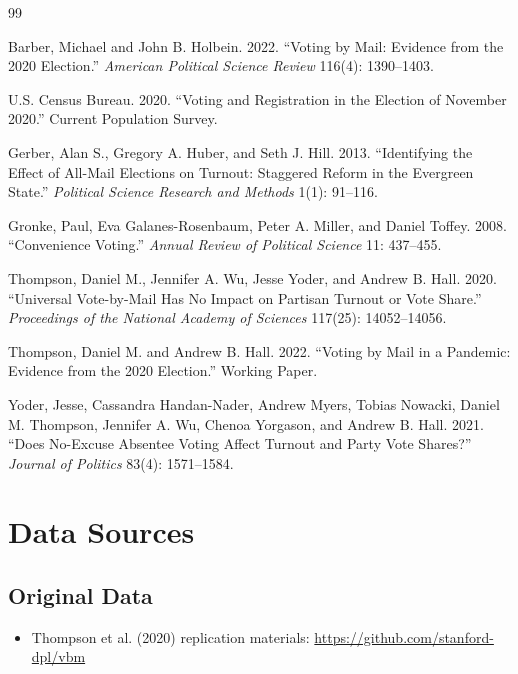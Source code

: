 \documentclass[12pt]{article}
\begin{document}
\newpage

\begin{thebibliography}{99}

Barber, Michael and John B. Holbein. 2022.
\newblock ``Voting by Mail: Evidence from the 2020 Election.''
\newblock \textit{American Political Science Review} 116(4): 1390--1403.

U.S. Census Bureau. 2020.
\newblock ``Voting and Registration in the Election of November 2020.''
\newblock Current Population Survey.

Gerber, Alan S., Gregory A. Huber, and Seth J. Hill. 2013.
\newblock ``Identifying the Effect of All-Mail Elections on Turnout: Staggered Reform in the Evergreen State.''
\newblock \textit{Political Science Research and Methods} 1(1): 91--116.

Gronke, Paul, Eva Galanes-Rosenbaum, Peter A. Miller, and Daniel Toffey. 2008.
\newblock ``Convenience Voting.''
\newblock \textit{Annual Review of Political Science} 11: 437--455.

Thompson, Daniel M., Jennifer A. Wu, Jesse Yoder, and Andrew B. Hall. 2020.
\newblock ``Universal Vote-by-Mail Has No Impact on Partisan Turnout or Vote Share.''
\newblock \textit{Proceedings of the National Academy of Sciences} 117(25): 14052--14056.

Thompson, Daniel M. and Andrew B. Hall. 2022.
\newblock ``Voting by Mail in a Pandemic: Evidence from the 2020 Election.''
\newblock Working Paper.

Yoder, Jesse, Cassandra Handan-Nader, Andrew Myers, Tobias Nowacki, Daniel M. Thompson, Jennifer A. Wu, Chenoa Yorgason, and Andrew B. Hall. 2021.
\newblock ``Does No-Excuse Absentee Voting Affect Turnout and Party Vote Shares?''
\newblock \textit{Journal of Politics} 83(4): 1571--1584.

\end{thebibliography}

\newpage
\appendix
\section{Data Sources}

\subsection{Original Data}
\begin{itemize}
    \item Thompson et al. (2020) replication materials: \url{https://github.com/stanford-dpl/vbm}
\end{itemize}
\end{document}
